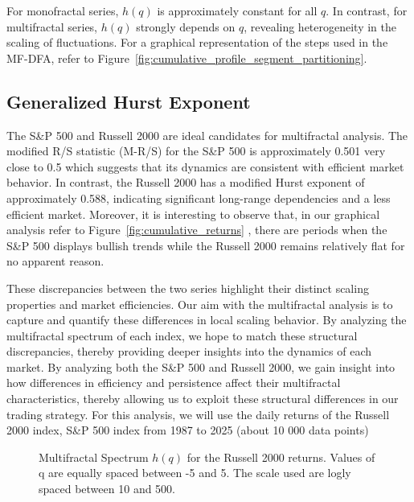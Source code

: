 \documentclass[11pt]{extarticle}
\begin{document}
For monofractal series, \(h(q)\) is approximately constant for all \(q\). In contrast, for multifractal
series, \(h(q)\) strongly depends on \(q\), revealing heterogeneity in the scaling of fluctuations.
For a graphical representation of the steps used in the MF-DFA, refer to Figure~\ref{fig:cumulative_profile_segment_partitioning}.

\subsection{Generalized Hurst Exponent}
\label{subsec:gen_hurst}

The S\&P 500 and Russell 2000 are ideal candidates for multifractal analysis.
The modified R/S statistic (M-R/S) for the S\&P 500 is approximately 0.501 very close to 0.5 which suggests that its
dynamics are consistent with efficient market behavior. In contrast, the Russell 2000 has a modified Hurst exponent of
approximately 0.588, indicating significant long-range dependencies and a less efficient market. Moreover, it is interesting
to observe that, in our graphical analysis refer to Figure~\ref{fig:cumulative_returns} , there are periods when the S\&P 500 displays bullish trends while the Russell 2000 remains relatively flat
for no apparent reason.

These discrepancies between the two series highlight their distinct scaling properties and market efficiencies. Our aim with
the multifractal analysis is to capture and quantify these differences in local scaling behavior. By analyzing the multifractal spectrum
of each index, we hope to match these structural discrepancies, thereby providing deeper insights into the dynamics of each market.
By analyzing both the S\&P 500 and Russell 2000, we gain insight into how differences in efficiency and persistence
affect their multifractal characteristics, thereby allowing us to exploit these structural differences in our trading strategy.
For this analysis, we will use the daily returns of the Russell 2000 index, S\&P 500 index from 1987 to 2025 (about 10 000 data points)

\begin{figure}[htbp]
    \centering
    \caption{Multifractal Spectrum $h(q)$ for the Russell 2000 returns. Values of q are equally spaced between -5 and 5.
    The scale used are logly spaced between 10 and 500.}
\end{figure}
\end{document}
